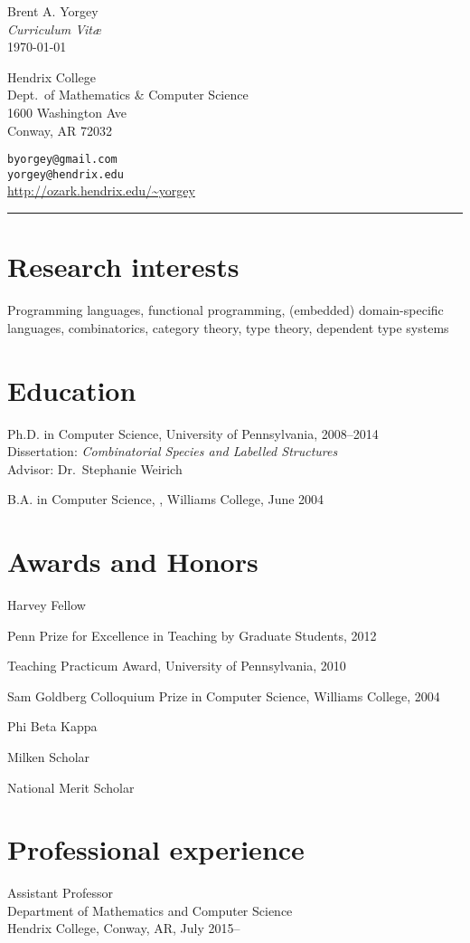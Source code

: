 \documentclass[12pt]{article}
\newcommand{\cvitem}{\par\hangpara{2em}{1}}
\begin{document}
\begin{center}
  {\huge Brent A. Yorgey} \\
  \emph{Curriculum Vit\ae} \\
  \today
\end{center}

\noindent
\parbox{3.5in}{
Hendrix College \\
Dept.\ of Mathematics \& Computer Science \\
1600 Washington Ave \\
Conway, AR 72032
}
\hfill
\parbox{3in}{
\texttt{byorgey@gmail.com} \\
\texttt{yorgey@hendrix.edu} \\
\url{http://ozark.hendrix.edu/~yorgey}
}
\medskip

\hrule


\section*{Research interests}
Programming languages, functional programming, (embedded)
domain-specific languages, combinatorics, category theory, type
theory, dependent type systems

\section*{Education}
\cvitem
Ph.D. in Computer Science, University of
Pennsylvania, 2008--2014 \\ Dissertation: \emph{Combinatorial
  Species and Labelled Structures} \\ Advisor: Dr.\ Stephanie Weirich

\cvitem B.A. in Computer Science, , Williams
College, June 2004

\section*{Awards and Honors}
\cvitem Harvey Fellow
\cvitem Penn Prize for Excellence in Teaching by Graduate Students, 2012
\cvitem Teaching Practicum Award, University of Pennsylvania, 2010
\cvitem Sam Goldberg Colloquium Prize in Computer Science, Williams
College, 2004
\cvitem Phi Beta Kappa
\cvitem Milken Scholar
\cvitem National Merit Scholar

\section*{Professional experience}
\cvitem
Assistant Professor \\
Department of Mathematics and Computer Science \\
Hendrix College, Conway, AR, July 2015--
\end{document}
